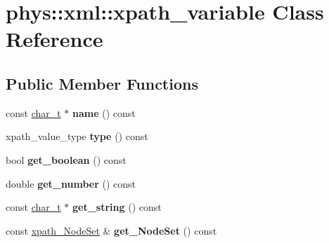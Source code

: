 \hypertarget{classphys_1_1xml_1_1xpath__variable}{
\section{phys::xml::xpath\_\-variable Class Reference}
\label{d8/d2c/classphys_1_1xml_1_1xpath__variable}
}
\subsection*{Public Member Functions}
\begin{DoxyCompactItemize}
\item 
\hypertarget{classphys_1_1xml_1_1xpath__variable_a8846df4f4e19d17625a609802160790f}{
const \hyperlink{namespacephys_1_1xml_afc87705cd1c2917d87b879715a2d8f6e}{char\_\-t} $\ast$ {\bfseries name} () const }
\label{d8/d2c/classphys_1_1xml_1_1xpath__variable_a8846df4f4e19d17625a609802160790f}

\item 
\hypertarget{classphys_1_1xml_1_1xpath__variable_a57edaea36e43573cf0928814fdceddbb}{
xpath\_\-value\_\-type {\bfseries type} () const }
\label{d8/d2c/classphys_1_1xml_1_1xpath__variable_a57edaea36e43573cf0928814fdceddbb}

\item 
\hypertarget{classphys_1_1xml_1_1xpath__variable_ac23a61d47aa2838c776ae876e06a8927}{
bool {\bfseries get\_\-boolean} () const }
\label{d8/d2c/classphys_1_1xml_1_1xpath__variable_ac23a61d47aa2838c776ae876e06a8927}

\item 
\hypertarget{classphys_1_1xml_1_1xpath__variable_a0972c04d65184f5ffbadc2a187313f1a}{
double {\bfseries get\_\-number} () const }
\label{d8/d2c/classphys_1_1xml_1_1xpath__variable_a0972c04d65184f5ffbadc2a187313f1a}

\item 
\hypertarget{classphys_1_1xml_1_1xpath__variable_ab0315cab85c5ed64aaf2b74b2e13e58c}{
const \hyperlink{namespacephys_1_1xml_afc87705cd1c2917d87b879715a2d8f6e}{char\_\-t} $\ast$ {\bfseries get\_\-string} () const }
\label{d8/d2c/classphys_1_1xml_1_1xpath__variable_ab0315cab85c5ed64aaf2b74b2e13e58c}

\item 
\hypertarget{classphys_1_1xml_1_1xpath__variable_acf8b1de1a36b1d47fe258692d9fecf97}{
const \hyperlink{classphys_1_1xml_1_1xpath__NodeSet}{xpath\_\-NodeSet} \& {\bfseries get\_\-NodeSet} () const }
\label{d8/d2c/classphys_1_1xml_1_1xpath__variable_acf8b1de1a36b1d47fe258692d9fecf97}


\end{DoxyCompactItemize}
